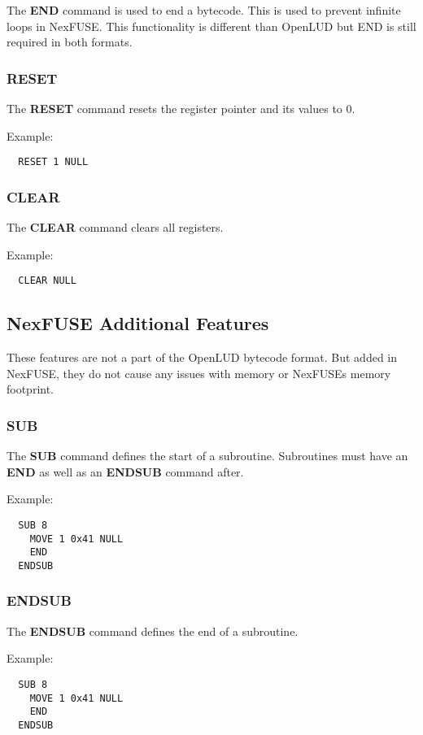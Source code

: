 \documentclass{article}
\begin{document}
The \textbf{END} command is used to end a bytecode. This is used to prevent
infinite loops in NexFUSE. This functionality is different than OpenLUD but END
is still required in both formats.

\subsubsection{\textbf{RESET}}

The \textbf{RESET} command resets the register pointer and its values to 0.

Example:
\begin{verbatim}
  RESET 1 NULL
\end{verbatim}

\subsubsection{\textbf{CLEAR}}

The \textbf{CLEAR} command clears all registers.

Example:
\begin{verbatim}
  CLEAR NULL
\end{verbatim}

\subsection{NexFUSE Additional Features}

These features are not a part of the OpenLUD bytecode format. But added in
NexFUSE, they do not cause any issues with memory or NexFUSEs memory footprint.

\subsubsection{\textbf{SUB}}

The \textbf{SUB} command defines the start of a subroutine. Subroutines must
have an \textbf{END} as well as an \textbf{ENDSUB} command after.

Example:
\begin{verbatim}
  SUB 8
    MOVE 1 0x41 NULL
    END
  ENDSUB
\end{verbatim}

\subsubsection{\textbf{ENDSUB}}

The \textbf{ENDSUB} command defines the end of a subroutine.

Example:
\begin{verbatim}
  SUB 8
    MOVE 1 0x41 NULL
    END
  ENDSUB
\end{verbatim}
\end{document}

